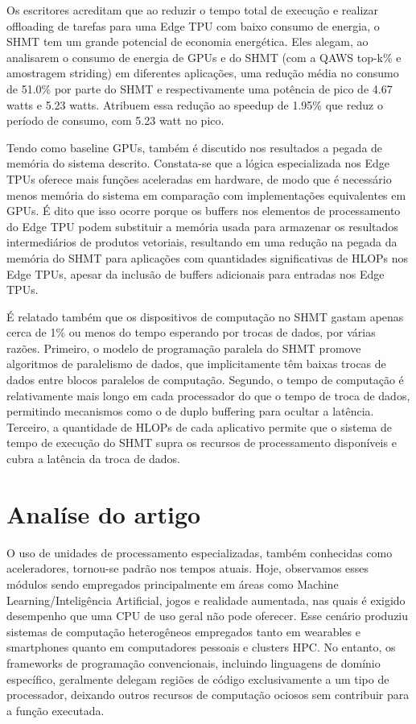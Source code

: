 \documentclass{article}
\begin{document}
Os escritores acreditam que ao reduzir o tempo total de execução e realizar offloading de tarefas para uma Edge TPU com baixo consumo de energia, o SHMT tem um grande potencial de economia energética. Eles alegam, ao analisarem o consumo de energia de GPUs e do SHMT (com a QAWS top-k\% e amostragem striding) em diferentes aplicações, uma redução média no consumo de 51.0\% por parte do SHMT e respectivamente uma potência de pico de 4.67 watts e 5.23 watts. Atribuem essa redução ao speedup de 1.95\% que reduz o período de consumo, com 5.23 watt no pico.

Tendo como baseline GPUs, também é discutido nos resultados a pegada de memória do sistema descrito. Constata-se que a lógica especializada nos Edge TPUs oferece mais funções aceleradas em hardware, de modo que é necessário menos memória do sistema em comparação com implementações equivalentes em GPUs. É dito que isso ocorre porque os buffers nos elementos de processamento do Edge TPU podem substituir a memória usada para armazenar os resultados intermediários de produtos vetoriais, resultando em uma redução na pegada da memória do SHMT para aplicações com quantidades significativas de HLOPs nos Edge TPUs, apesar da inclusão de buffers adicionais para entradas nos Edge TPUs.

 É relatado também que os dispositivos de computação no SHMT gastam apenas cerca de 1\% ou menos do tempo esperando por trocas de dados, por várias razões. Primeiro, o modelo de programação paralela do SHMT promove algoritmos de paralelismo de dados, que implicitamente têm baixas trocas de dados entre blocos paralelos de computação. Segundo, o tempo de computação é relativamente mais longo em cada processador do que o tempo de troca de dados, permitindo mecanismos como o de duplo buffering para ocultar a latência. Terceiro, a quantidade de HLOPs de cada aplicativo permite que o sistema de tempo de execução do SHMT supra os recursos de processamento disponíveis e cubra a latência da troca de dados.

\section{Analíse do artigo}

O uso de unidades de processamento especializadas, também conhecidas como aceleradores, tornou-se padrão nos tempos atuais. Hoje, observamos esses módulos sendo empregados principalmente em áreas como Machine Learning/Inteligência Artificial, jogos e realidade aumentada, nas quais é exigido desempenho que uma CPU de uso geral não pode oferecer. Esse cenário produziu sistemas de computação heterogêneos empregados tanto em wearables e smartphones quanto em computadores pessoais e clusters HPC. No entanto, os frameworks de programação convencionais, incluindo linguagens de domínio específico, geralmente delegam regiões de código exclusivamente a um tipo de processador, deixando outros recursos de computação ociosos sem contribuir para a função executada.
\end{document}
